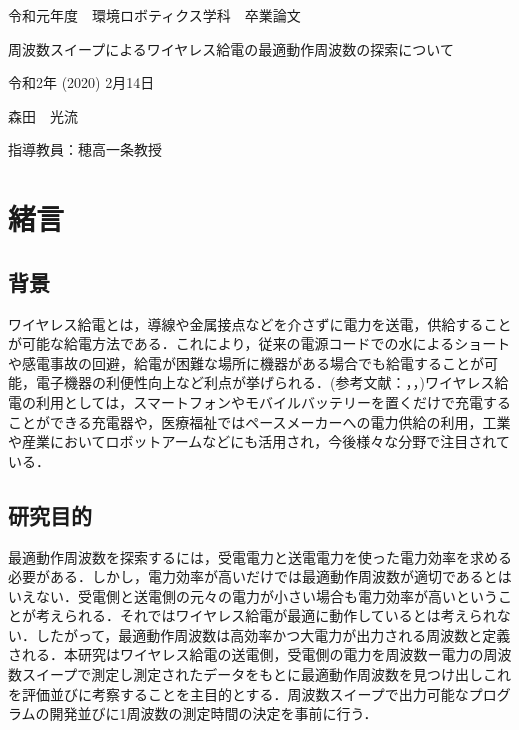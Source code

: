 \documentclass[12pt]{jarticle}
\begin{document}
	
\thispagestyle{empty}

\vspace*{20mm}
\begin{center}
	{\Large 令和元年度　環境ロボティクス学科　卒業論文}
\end{center}
\vspace{10mm}
\begin{center}
	{\Huge 周波数スイープによるワイヤレス給電の最適動作周波数の探索について}
\end{center}
\vspace{90mm}
\begin{center}
	{\Large 令和2年 (2020) 2月14日}
\end{center}
\begin{center}
	{\Large 森田　光流}
\end{center}
\begin{center}
	{\Large 指導教員：穂高一条教授}
\end{center}

\clearpage

\tableofcontents

\clearpage

\section{緒言}
\subsection{背景}
ワイヤレス給電とは，導線や金属接点などを介さずに電力を送電，供給することが可能な給電方法である．これにより，従来の電源コードでの水によるショートや感電事故の回避，給電が困難な場所に機器がある場合でも給電することが可能，電子機器の利便性向上など利点が挙げられる．(参考文献：\cite{matuda}，\cite{nakamura}，\cite{rohm})ワイヤレス給電の利用としては，スマートフォンやモバイルバッテリーを置くだけで充電することができる充電器や，医療福祉ではペースメーカーへの電力供給の利用，工業や産業においてロボットアームなどにも活用され，今後様々な分野で注目されている．
\\ 
\subsection{研究目的}
最適動作周波数を探索するには，受電電力と送電電力を使った電力効率を求める必要がある．しかし，電力効率が高いだけでは最適動作周波数が適切であるとはいえない．受電側と送電側の元々の電力が小さい場合も電力効率が高いということが考えられる．それではワイヤレス給電が最適に動作しているとは考えられない．したがって，最適動作周波数は高効率かつ大電力が出力される周波数と定義される．本研究はワイヤレス給電の送電側，受電側の電力を周波数ー電力の周波数スイープで測定し測定されたデータをもとに最適動作周波数を見つけ出しこれを評価並びに考察することを主目的とする．周波数スイープで出力可能なプログラムの開発並びに1周波数の測定時間の決定を事前に行う．
\clearpage
\end{document}
